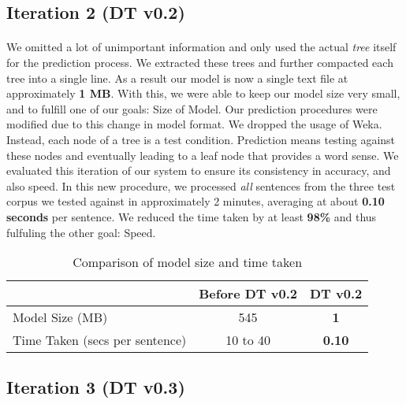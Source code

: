 \documentclass[a4paper,12pt]{nurop}
\begin{document}
\subsection{Iteration 2 (DT v0.2)}
\label{it:2}
\paragraph{}
We omitted a lot of unimportant information and only used the actual \textit{tree} itself for the prediction process. We extracted these trees and further compacted each tree into a single line. As a result our model is now a single text file at approximately \textbf{1 MB}. With this, we were able to keep our model size very small, and to fulfill one of our goals: Size of Model. Our prediction procedures were modified due to this change in model format. We dropped the usage of Weka. Instead, each node of a tree is a test condition. Prediction means testing against these nodes and eventually leading to a leaf node that provides a word sense. We evaluated this iteration of our system to ensure its consistency in accuracy, and also speed. In this new procedure, we processed \textit{all} sentences from the three test corpus we tested against in approximately 2 minutes, averaging at about \textbf{0.10 seconds} per sentence. We reduced the time taken by at least \textbf{98\%} and thus fulfuling the other goal: Speed.

\begin{table}[h]
\footnotesize
	\center
	\begin{tabular}{| l | c | c |}
		\hline
		& Before DT v0.2 & DT v0.2\\
		\hline
		Model Size (MB) & 545 & \textbf{1} \\
		\hline
		Time Taken (secs per sentence) & 10 to 40 & \textbf{0.10} \\
		\hline
	\end{tabular}
	\caption{Comparison of model size and time taken}
	\label{tab:spaceandtime}
\end{table}

\subsection{Iteration 3 (DT v0.3)}
\label{it:3}
\end{document}
